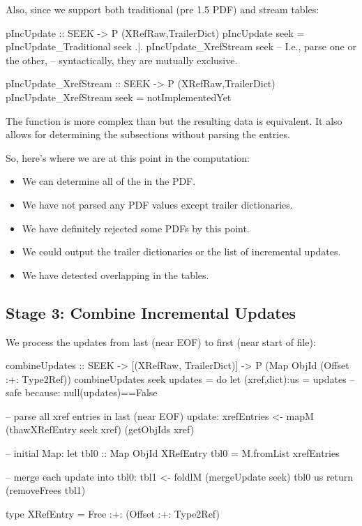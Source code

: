 Also, since we support both traditional (pre 1.5 PDF) and stream
\xref{} tables:

\begin{code}
pIncUpdate :: SEEK -> P (XRefRaw,TrailerDict)
pIncUpdate seek =
      pIncUpdate_Traditional seek
  .|. pIncUpdate_XrefStream seek
      -- I.e., parse one or the other,
      -- syntactically, they are mutually exclusive.

pIncUpdate_XrefStream :: SEEK -> P (XRefRaw,TrailerDict)
pIncUpdate_XrefStream seek = notImplementedYet
\end{code}

The function  is more
complex than  but the resulting
data is equivalent.  It also allows for determining the subsections
without parsing the \xref{} entries.

So, here's where we are at this point in the computation:
\begin{itemize}
\item We can determine all of the \objids{} in the PDF.
\item We have not parsed any PDF values except trailer dictionaries.
\item We have definitely rejected some PDFs by this point.
\item We could output the trailer dictionaries or the list of
  incremental updates.
\item We have detected overlapping \objids{} in the \xref{} tables.
\end{itemize}


\subsection{Stage 3: Combine Incremental Updates}

We process the updates from last (near EOF) to first (near start of file):
\begin{code}
combineUpdates :: SEEK
               -> [(XRefRaw, TrailerDict)] 
               -> P (Map ObjId (Offset :+: Type2Ref))
combineUpdates seek updates =
    do
    let (xref,dict):us = updates -- safe because: null(updates)==False

    -- parse all xref entries in last (near EOF) update:
    xrefEntries <- mapM (thawXRefEntry seek xref) (getObjIds xref)

    -- initial Map:
    let tbl0 :: Map ObjId XRefEntry
        tbl0 = M.fromList xrefEntries

    -- merge each update into tbl0:
    tbl1  <- foldlM (mergeUpdate seek) tbl0 us
    return (removeFrees tbl1)

type XRefEntry = Free :+: (Offset :+: Type2Ref)
\end{code}

